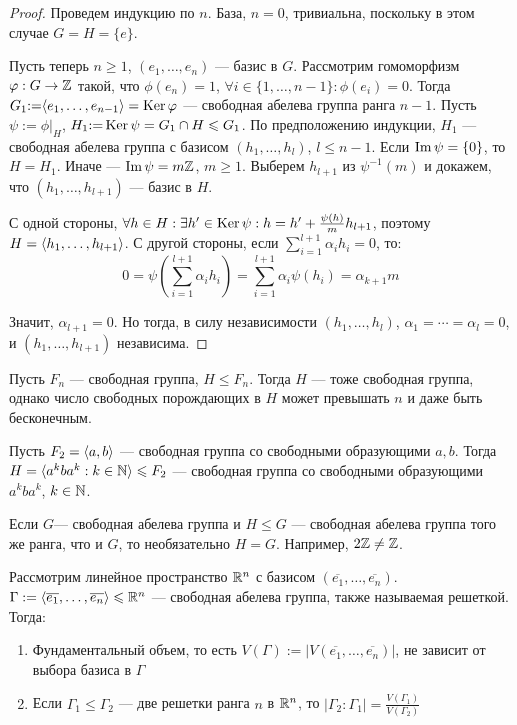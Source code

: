 \begin{proof}
	Проведем индукцию по $n$. База, $n = 0$, тривиальна, поскольку в этом случае $G = H =  \{e\}$.
	
	Пусть теперь $n \ge 1$, $(e_1, \ldots, e_n)$ --- базис в $G$. Рассмотрим гомоморфизм $\varphi: G \to \mathbb{Z}$ такой, что $\phi(e_n) = 1$, $\forall i \in \{1, \ldots, n - 1\}: \phi(e_i) = 0$. Тогда $G_1 {:=} \langle e_1, \ldots, e_{n - 1} \rangle = \operatorname{Ker}\varphi$ --- свободная абелева группа ранга $n - 1$. Пусть $\psi := \phi|_H$, $H_1 {:=} \operatorname{Ker}\psi = G_1 \cap H \leqslant G_1$. По предположению индукции, $H_1$ --- свободная абелева группа с базисом $(h_1, \ldots, h_l)$, $l \le n - 1$. Если $\operatorname{Im}\psi = \{0\}$, то $H = H_1$. Иначе --- $\operatorname{Im}\psi = m\mathbb{Z}$, $m \ge 1$. Выберем $h_{l + 1}$ из $\psi^{-1}(m)$ и докажем, что $(h_1, \ldots, h_{l + 1})$ --- базис в $H$.
	
	С одной стороны, $\forall h \in H: \exists h' \in \operatorname{Ker}\psi: h = h' + \frac{\psi(h)}{m}h_{l + 1}$, поэтому $H = \langle h_1, \ldots, h_{l + 1} \rangle$. С другой стороны, если $\sum_{i = 1}^{l + 1}\alpha_ih_i = 0$, то:
	\[0 = \psi\left(\sum_{i = 1}^{l + 1}\alpha_ih_i\right) = \sum_{i = 1}^{l+1}\alpha_i\psi(h_i) = \alpha_{k+1}m\]
	
	Значит, $\alpha_{l + 1} = 0$. Но тогда, в силу независимости $(h_1, \ldots, h_l)$, $\alpha_1 = \dotsb = \alpha_l = 0$, и $(h_1, \ldots, h_{l+1})$ независима.
\end{proof}

\begin{note}
	Пусть $F_n$ --- свободная группа,  $H \le F_n$. Тогда $H$ --- тоже свободная группа, однако число свободных порождающих в $H$ может превышать $n$ и даже быть бесконечным.
\end{note}

\begin{example}
	Пусть $F_2 = \langle a, b \rangle$ --- свободная группа со свободными образующими $a, b$. Тогда $H = \langle a^kba^k : k \in \mathbb{N} \rangle \leqslant F_2$ --- свободная группа со свободными образующими $a^kba^k$, $k \in \mathbb{N}$.
\end{example}

\begin{note}
	Если $G$--- свободная абелева группа и $H \le G$ --- свободная абелева группа того же ранга, что и $G$, то необязательно $H = G$. Например, $2\mathbb{Z} \ne \mathbb{Z}$.
\end{note}

\begin{exercise}
	Рассмотрим линейное пространство $\mathbb{R}^n$ с базисом $(\overline{e_1}, \ldots, \overline{e_n})$. $\Gamma := \langle \overline{e_1}, \ldots, \overline{e_n}\rangle \leqslant \mathbb{R}^n$ --- свободная абелева группа, также называемая решеткой. Тогда:
	\begin{enumerate}
		\item Фундаментальный объем, то есть $V(\Gamma) := |V(\overline{e_1}, \ldots, \overline{e_n})|$, не зависит от выбора базиса в $\Gamma$
		
		\item Если $\Gamma_1 \le \Gamma_2$ --- две решетки ранга $n$ в $\mathbb{R}^n$, то $|\Gamma_2 : \Gamma_1| = \frac{V(\Gamma_1)}{V(\Gamma_2)}$
	\end{enumerate}
\end{exercise}

